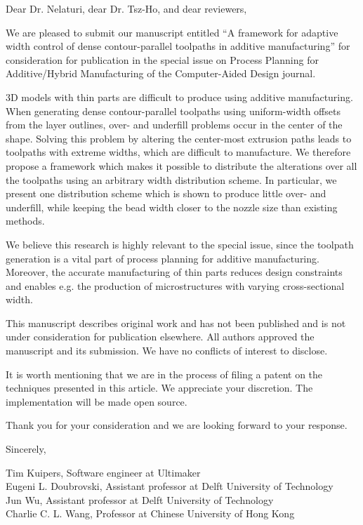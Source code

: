 \documentclass[a4paper,12pt]{letter}
\begin{document}
\begin{letter}{}


\vspace*{-8\baselineskip}%

\opening{Dear  Dr. Nelaturi, dear Dr. Tsz-Ho, and dear reviewers,}



We are pleased to submit our manuscript entitled ``A framework for adaptive width control of dense contour-parallel toolpaths in additive manufacturing'' for consideration for publication in the special issue on Process Planning for Additive/Hybrid Manufacturing of the Computer-Aided Design journal.

3D models with thin parts are difficult to produce using additive manufacturing.
When generating dense contour-parallel toolpaths using uniform-width offsets from the layer outlines,
over- and underfill problems occur in the center of the shape.
Solving this problem by altering the center-most extrusion paths leads to toolpaths with extreme widths, which are difficult to manufacture.
We therefore propose a framework which makes it possible to distribute the alterations over all the toolpaths using an arbitrary width distribution scheme.
In particular, we present one distribution scheme which is shown to produce little over- and underfill, while keeping the bead width closer to the nozzle size than existing methods.

We believe this research is highly relevant to the special issue, since the toolpath generation is a vital part of process planning for additive manufacturing.
Moreover, the accurate manufacturing of thin parts reduces design constraints and enables e.g. the production of microstructures with varying cross-sectional width.

This manuscript describes original work and has not been published and is not under consideration for publication elsewhere.  All authors approved the manuscript and its submission. We have no conflicts of interest to disclose.

It is worth mentioning that we are in the process of filing a patent on the techniques presented in this article. We appreciate your discretion. The implementation will be made open source. 

Thank you for your consideration and we are looking forward to your response.

\medskip

Sincerely,

\medskip 
Tim Kuipers, Software engineer at Ultimaker \\
Eugeni L. Doubrovski, Assistant professor at  Delft University of Technology \\
Jun Wu, Assistant professor at Delft University of Technology \\
Charlie C. L. Wang, Professor at Chinese University of Hong Kong



\end{letter}
\end{document}
